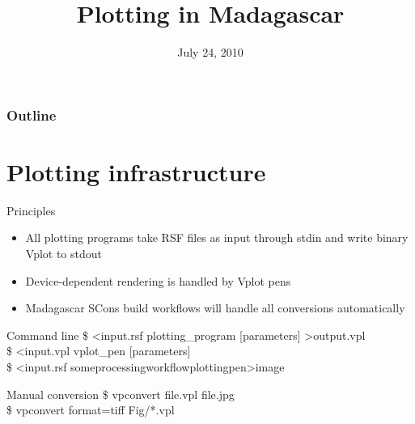 \newcommand{\sconscode}[3]
{
  \begin{block}{}
  
  \end{block}
}

%
%
\title[]{Plotting in Madagascar}

\date[Madagascar school in Houston] %
{July 24, 2010}

\begin{frame}
  \titlepage
  \appendix
\end{frame}

\begin{frame}
  \frametitle{Outline}
   \hspace*{2cm}
   \begin{minipage}[t][3cm]{10cm}
    \tableofcontents
   \end{minipage}
\end{frame}

\section{Plotting infrastructure}

\begin{frame}
  \begin{block}{Principles}
    \begin{itemize}
      \item All plotting programs take RSF files as input through stdin and write binary Vplot to stdout
      \item Device-dependent rendering is handled by Vplot pens
      \item Madagascar SCons build workflows will handle all conversions automatically
    \end{itemize}
  \end{block}
  \begin{block}{Command line}
    \$ \textless input.rsf plotting\_program [parameters] \textgreater output.vpl \\
    \$ \textless input.vpl vplot\_pen [parameters] \\
    \$ \textless input.rsf some\textbar processing\textbar workflow\textbar plotting\textbar pen\textgreater image
  \end{block}

  \begin{block}{Manual conversion}
    \$ vpconvert file.vpl file.jpg \\
    \$ vpconvert format=tiff Fig/*.vpl
  \end{block}
\end{frame}

